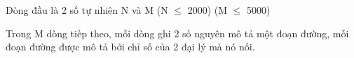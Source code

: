 Dòng đầu là 2 số tự nhiên N và M (N $\le$ 2000) (M $\le$ 5000)

Trong M dòng tiếp theo, mỗi dòng ghi 2 số nguyên mô tả một đoạn đường, mỗi đoạn đường được mô tả bởi chỉ số của 2 đại lý mà nó nối.

\